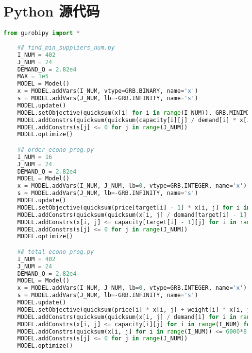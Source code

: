 \documentclass[withoutpreface,bwprint]{cumcmthesis} %
\begin{document}
\begin{appendices}
\begin{lstlisting}[language=matlab]
\end{lstlisting}

\section{Python 源代码}
\begin{lstlisting}[language=python]
    from gurobipy import *
    
    ## find_min_suppliers_num.py
    I_NUM = 402
    J_NUM = 24
    DEMAND_Q = 2.82e4
    MAX = 1e5
    MODEL = Model()
    x = MODEL.addVars(I_NUM, vtype=GRB.BINARY, name='x')
    s = MODEL.addVars(J_NUM, lb=-GRB.INFINITY, name='s')
    MODEL.update()
    MODEL.setObjective(quicksum(x[i] for i in range(I_NUM)), GRB.MINIMIZE)
    MODEL.addConstrs(quicksum(quicksum(capacity[i][j] / demand[i] * x[i] for i in range(I_NUM)) for j in range(k)) + s[k - 1] == DEMAND_Q * k for k in range(1, J_NUM + 1))
    MODEL.addConstrs(s[j] <= 0 for j in range(J_NUM))
    MODEL.optimize()

    ## order_econo_prog.py
    I_NUM = 16
    J_NUM = 24
    DEMAND_Q = 2.82e4
    MODEL = Model()
    x = MODEL.addVars(I_NUM, J_NUM, lb=0, vtype=GRB.INTEGER, name='x')
    s = MODEL.addVars(J_NUM, lb=-GRB.INFINITY, name='s')
    MODEL.update()
    MODEL.setObjective(quicksum(price[target[i] - 1] * x[i, j] for i in range(I_NUM) for j in range(J_NUM)), GRB.MINIMIZE)
    MODEL.addConstrs(quicksum(quicksum(x[i, j] / demand[target[i] - 1] for i in range(I_NUM)) for j in range(k)) + s[k - 1] >= DEMAND_Q * k for k in range(1, J_NUM + 1))
    MODEL.addConstrs(x[i, j] <= capacity[target[i] - 1][j] for i in range(I_NUM) for j in range(J_NUM))
    MODEL.addConstrs(s[j] <= 0 for j in range(J_NUM))
    MODEL.optimize()

    ## total_econo_prog.py
    I_NUM = 402
    J_NUM = 24
    DEMAND_Q = 2.82e4
    MODEL = Model()
    x = MODEL.addVars(I_NUM, J_NUM, lb=0, vtype=GRB.INTEGER, name='x')
    s = MODEL.addVars(J_NUM, lb=-GRB.INFINITY, name='s')
    MODEL.update()
    MODEL.setObjective(quicksum(price[i] * x[i, j] + weight[i] * x[i, j] for i in range(I_NUM) for j in range(J_NUM)), GRB.MINIMIZE)
    MODEL.addConstrs(quicksum(quicksum(x[i, j] / demand[i] for i in range(I_NUM)) for j in range(k)) + s[k - 1] == DEMAND_Q * k for k in range(1, J_NUM + 1))
    MODEL.addConstrs(x[i, j] <= capacity[i][j] for i in range(I_NUM) for j in range(J_NUM))
    MODEL.addConstrs(quicksum(x[i, j] for i in range(I_NUM)) <= 6000*8 for j in range(J_NUM))
    MODEL.addConstrs(s[j] <= 0 for j in range(J_NUM))
    MODEL.optimize()


\end{lstlisting}
\end{appendices}
\end{document}

